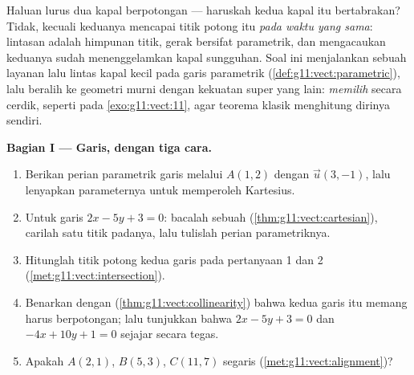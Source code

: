 \begin{problem}
\label{pb:g11:vect:1}
Haluan lurus dua kapal berpotongan --- haruskah kedua kapal itu
bertabrakan? Tidak,
kecuali keduanya mencapai titik potong itu \emph{pada waktu yang sama}:
lintasan adalah himpunan titik, gerak bersifat parametrik, dan mengacaukan
keduanya sudah menenggelamkan kapal sungguhan. Soal ini menjalankan sebuah
layanan lalu lintas kapal kecil pada garis parametrik
(\cref{def:g11:vect:parametric}), lalu beralih ke geometri murni dengan
kekuatan super  yang lain: \emph{memilih}  secara cerdik,
seperti pada \cref{exo:g11:vect:11}, agar teorema klasik menghitung dirinya
sendiri.

\medskip
\noindent\textbf{Bagian I --- Garis, dengan tiga cara.}
\begin{enumerate}
  \item Berikan perian parametrik garis melalui
        $A(1, 2)$ dengan  $\vec u(3, -1)$, lalu
        lenyapkan parameternya untuk memperoleh  Kartesius.
  \item Untuk garis $2x - 5y + 3 = 0$: bacalah sebuah  (\cref{thm:g11:vect:cartesian}), carilah satu titik padanya,
        lalu tulislah perian parametriknya.
  \item Hitunglah titik potong kedua garis pada
        pertanyaan 1 dan 2 (\cref{met:g11:vect:intersection}).
  \item Benarkan dengan 
        (\cref{thm:g11:vect:collinearity}) bahwa kedua garis itu
        memang harus berpotongan; lalu tunjukkan bahwa $2x - 5y + 3 = 0$ dan
        $-4x + 10y + 1 = 0$ sejajar secara tegas.
  \item Apakah $A(2, 1)$, $B(5, 3)$, $C(11, 7)$ segaris
        (\cref{met:g11:vect:alignment})?
\end{enumerate}


\end{problem}
